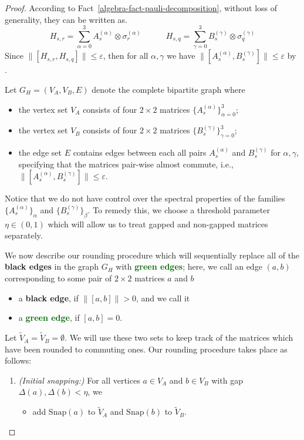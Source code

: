 \documentclass[11pt]{article}
\theoremstyle{plain}
\newcommand{\eps}{\varepsilon}
\begin{document}
\begin{proof}
According to Fact~\ref{algebra-fact-pauli-decomposition}, without loss of generality, they can be written as.
    \begin{equation}
        H_{s,r} = \sum\limits_{\alpha = 0}^{3} A_s^{(\alpha)} \otimes \sigma_r^{(\alpha)} \quad\quad\quad H_{s,q} = \sum\limits_{\gamma = 0}^{3} B_s^{(\gamma)} \otimes \sigma_q^{(\gamma)}
    \end{equation}
Since $\|[H_{s, r}, H_{s, q}]\| \leq \eps$, then for all $\alpha, \gamma$ we have $\|[A_s^{(\alpha)}, B_s^{(\gamma)}]\| \leq \eps$ by .    

Let $G_H = (V_A,V_B,E)$ denote the complete bipartite graph where
\begin{itemize}
    \item the vertex set $V_A$ consists of four $2 \times 2$ matrices $\{A_s^{(\alpha)}\}_{\alpha=0}^3$;
    \item the vertex set $V_B$ consists of four $2 \times 2$ matrices $\{B_s^{(\gamma)}\}_{\gamma=0}^3$;
\item the edge set $E$ contains edges between each all pairs $A_s^{(\alpha)}$ and $B_s^{(\gamma)}$ for $\alpha,\gamma$, specifying that the matrices pair-wise almost commute, i.e., $\|[A_s^{(\alpha)}, B_s^{(\gamma)}]\| \leq \eps$.
\end{itemize}
Notice that we do not have control over the spectral properties of the families $\{A_s^{(\alpha)}\}_\alpha$ and $\{B_s^{(\gamma)}\}_\beta$. To remedy this, we choose a threshold parameter $\eta \in (0,1)$ which will allow us to treat gapped and non-gapped matrices separately.

We now describe our rounding procedure which will sequentially replace all of the \textbf{black edges} in the graph $G_H$ with \textbf{\textcolor{DarkGreen}{green edges}}; here, we call an edge $(a,b)$ corresponding to some pair of $2 \times 2$ matrices $a$ and $b$
\begin{itemize}
    \item a \textbf{black edge}, if 
$    
\|[a,b]\| >0$, and we call it
\item a 
\textbf{\textcolor{DarkGreen}{green edge}}, if $    
[a,b]=0$.
\end{itemize}
Let $\tilde{V}_A = \tilde{V}_B= \emptyset$. We will use these two sets to keep track of the matrices which have been rounded to commuting ones. Our rounding procedure takes place as follows:
\begin{enumerate}
\item \emph{(Initial snapping:)} For all vertices $a \in V_A$ and $b \in V_B$ with gap $\Delta(a),\Delta(b) < \eta$, we
\begin{itemize}
    \item add $\mathrm{Snap}(a)$ to $\tilde{V}_A$ and $\mathrm{Snap}(b)$ to $\tilde{V}_B$.


\end{itemize}
\end{enumerate}
\end{proof}
\end{document}
